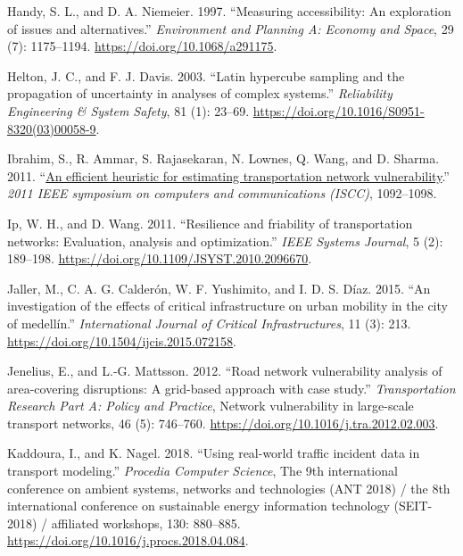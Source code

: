 \documentclass[]{ascelike-new}
\newlength{\cslhangindent}
\newenvironment{CSLReferences}[2] %
 {\begin{list}{}{%
  \setlength{\itemindent}{0pt}
  \setlength{\leftmargin}{0pt}
  \setlength{\parsep}{0pt}
  \ifodd #1
   \setlength{\leftmargin}{\cslhangindent}
   \setlength{\itemindent}{-1\cslhangindent}
  \fi
  \setlength{\itemsep}{#2\baselineskip}}}
 {\end{list}}
\begin{document}
\begin{CSLReferences}{1}{0}
Handy, S. L., and D. A. Niemeier. 1997. {``Measuring accessibility: An
exploration of issues and alternatives.''} \emph{Environment and
Planning A: Economy and Space}, 29 (7): 1175--1194.
\url{https://doi.org/10.1068/a291175}.

Helton, J. C., and F. J. Davis. 2003. {``Latin hypercube sampling and
the propagation of uncertainty in analyses of complex systems.''}
\emph{Reliability Engineering \& System Safety}, 81 (1): 23--69.
\url{https://doi.org/10.1016/S0951-8320(03)00058-9}.

Ibrahim, S., R. Ammar, S. Rajasekaran, N. Lownes, Q. Wang, and D.
Sharma. 2011. {``\href{https://doi.org/10.1109/ISCC.2011.5983988}{An
efficient heuristic for estimating transportation network
vulnerability}.''} \emph{2011 IEEE symposium on computers and
communications (ISCC)}, 1092--1098.

Ip, W. H., and D. Wang. 2011. {``Resilience and friability of
transportation networks: Evaluation, analysis and optimization.''}
\emph{IEEE Systems Journal}, 5 (2): 189--198.
\url{https://doi.org/10.1109/JSYST.2010.2096670}.

Jaller, M., C. A. G. Calderón, W. F. Yushimito, and I. D. S. Díaz. 2015.
{``An investigation of the effects of critical infrastructure on urban
mobility in the city of medellín.''} \emph{International Journal of
Critical Infrastructures}, 11 (3): 213.
\url{https://doi.org/10.1504/ijcis.2015.072158}.

Jenelius, E., and L.-G. Mattsson. 2012. {``Road network vulnerability
analysis of area-covering disruptions: A grid-based approach with case
study.''} \emph{Transportation Research Part A: Policy and Practice},
Network vulnerability in large-scale transport networks, 46 (5):
746--760. \url{https://doi.org/10.1016/j.tra.2012.02.003}.

Kaddoura, I., and K. Nagel. 2018. {``Using real-world traffic incident
data in transport modeling.''} \emph{Procedia Computer Science}, The 9th
international conference on ambient systems, networks and technologies
({ANT} 2018) / the 8th international conference on sustainable energy
information technology ({SEIT-2018}) / affiliated workshops, 130:
880--885. \url{https://doi.org/10.1016/j.procs.2018.04.084}.


\end{CSLReferences}
\end{document}
